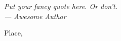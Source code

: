 \begingroup
\cleardoublepage
\let\clearpage\relax
\let\cleardoublepage\relax
\begin{flushright}\slshape
	Put your fancy quote here. Or don't. \\ \medskip
	--- Awesome Author
\end{flushright}

\bigskip
{}


\blindmathfalse
\blindtext

\bigskip

\begin{flushright}
	Place, \doctime
\end{flushright}

\endgroup